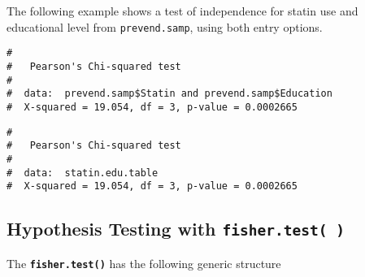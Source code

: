 \documentclass[letterpaper,12pt,twoside,]{pinp}
\begin{document}
The following example shows a test of independence for statin use and
educational level from \texttt{prevend.samp}, using both entry options.

\begin{Shaded}
\begin{Highlighting}[]
\NormalTok{(}\NormalTok{)}

\OperatorTok{$}\OperatorTok{$}
\end{Highlighting}
\end{Shaded}

\begin{ShadedResult}
\begin{verbatim}
#  
#   Pearson's Chi-squared test
#  
#  data:  prevend.samp$Statin and prevend.samp$Education
#  X-squared = 19.054, df = 3, p-value = 0.0002665
\end{verbatim}
\end{ShadedResult}

\begin{Shaded}
\begin{Highlighting}[]
\StringTok{ }\OperatorTok{$}\OperatorTok{$}
\end{Highlighting}
\end{Shaded}

\begin{ShadedResult}
\begin{verbatim}
#  
#   Pearson's Chi-squared test
#  
#  data:  statin.edu.table
#  X-squared = 19.054, df = 3, p-value = 0.0002665
\end{verbatim}
\end{ShadedResult}

\hypertarget{hypothesis-testing-with-3}{%
\subsection{\texorpdfstring{Hypothesis Testing with
\texttt{fisher.test( )}}{Hypothesis Testing with }}\label{hypothesis-testing-with-3}}

The \textbf{\texttt{fisher.test()}} has the following generic structure

\begin{Shaded}
\begin{Highlighting}[]
 \NormalTok{)}
\end{Highlighting}
\end{Shaded}
\end{document}
